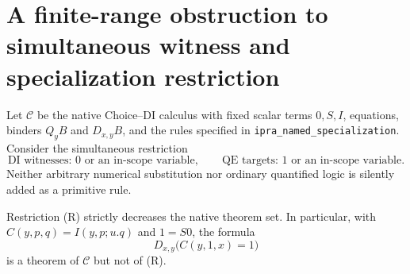 \section{A finite-range obstruction to simultaneous witness and specialization restriction}
\label{sec:finite-restriction}
Let $\mathcal C$ be the native Choice--DI calculus with fixed scalar terms
$0,S,I$, equations, binders $Q_yB$ and $D_{x,y}B$, and the rules specified in
\texttt{ipra\_named\_specialization}. Consider the simultaneous restriction
\[
\text{DI witnesses: }0\text{ or an in-scope variable},\qquad
\text{QE targets: }1\text{ or an in-scope variable}.
\tag{R}
\]
Neither arbitrary numerical substitution nor ordinary quantified logic
is silently added as a primitive rule.

\begin{theorem}
Restriction (R) strictly decreases the native theorem set. In particular,
with $C(y,p,q)=I(y,p;u.q)$ and $1=S0$, the formula
\[
D_{x,y}\bigl(C(y,1,x)=1\bigr)
\tag{N1}
\]
is a theorem of $\mathcal C$ but not of (R).
\end{theorem}
